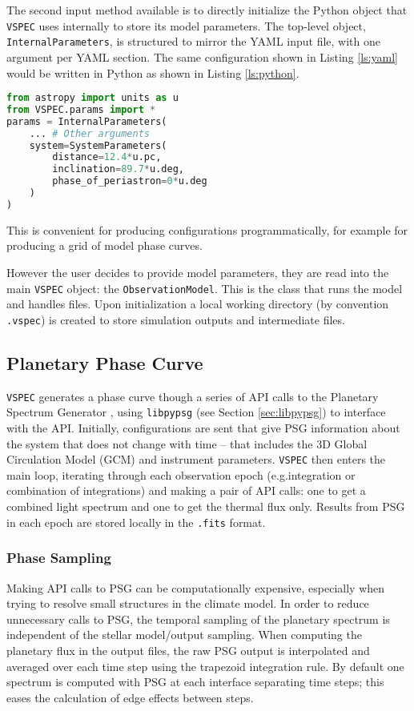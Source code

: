 \documentclass[linenumbers,preprint,authoryear]{elsarticle}
\newcommand{\vspec}[1]{\texttt{VSPEC}#1}
\begin{document}
The second input method available is to directly initialize the Python object that \vspec{} uses internally to store its model parameters.
The top-level object, \texttt{InternalParameters}, is structured to mirror the YAML input file, with one argument per YAML section. The same
configuration shown in Listing \ref{ls:yaml} would be written in Python as shown in Listing \ref{ls:python}.
\begin{lstlisting}[language=Python, caption={\vspec{} Python configuration},label={ls:python}]
from astropy import units as u
from VSPEC.params import *
params = InternalParameters(
    ... # Other arguments
    system=SystemParameters(
        distance=12.4*u.pc,
        inclination=89.7*u.deg,
        phase_of_periastron=0*u.deg
    )
)
\end{lstlisting}
This is convenient for producing configurations programmatically, for example for producing a grid of model phase curves.

However the user decides to provide model parameters, they are read into the main \vspec{} object: the \texttt{ObservationModel}.
This is the class that runs the model and handles files. Upon initialization a local working directory
(by convention \texttt{.vspec}) is created to store simulation outputs and intermediate files.

\subsection{Planetary Phase Curve}
\label{subsec:phase-curve}
\vspec{} generates a phase curve though a series of API calls to the Planetary Spectrum Generator \citep[PSG][]{villanueva2018}, using
\texttt{libpypsg} (see Section \ref{sec:libpypsg}) to interface with the API. Initially, configurations are sent that give PSG information about
the system that does not change with time -- that includes the 3D Global Circulation Model (GCM) and instrument parameters. \vspec{} then enters
the main loop, iterating through each observation epoch (e.g.integration or combination of integrations) and making a pair of API calls: one to get a combined light spectrum and one to get the thermal flux only.
Results from PSG in each epoch are stored locally in the \texttt{.fits} format. 

\subsubsection{Phase Sampling}
Making API calls to PSG can be computationally expensive, especially when trying to resolve small structures in the climate model. In order to reduce unnecessary calls to PSG, the temporal sampling of the planetary spectrum is independent of the stellar model/output sampling. When computing the planetary flux in the output files, the raw PSG output is interpolated and averaged over each time step using the trapezoid integration rule. By default one spectrum is computed with PSG at each interface separating time steps; this eases the calculation of edge effects between steps.
\end{document}
